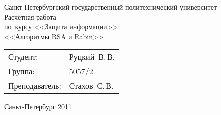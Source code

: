 %
%

\begin{titlepage} %

\begin{center} %

\large Санкт-Петербургский государственный политехнический университет\\[5.5cm]

\huge Расчётная работа\\[0.6cm] %
\large по~курсу <<Защита информации>>\\[1cm]
\large <<Алгоритмы RSA и Rabin>>\\[6cm]

\begin{flushright} %
\begin{tabular}{l l}
Студент: & Руцкий~В.\,В.\\
Группа: & 5057/2\\
Преподаватель: & Стахов~С.\,В.
\end{tabular}
\end{flushright} %

\vfill %

{\large Санкт-Петербург 2011}
\end{center} %
\thispagestyle{empty} %
\end{titlepage} %
